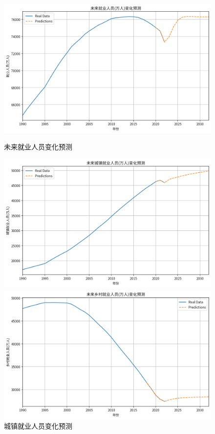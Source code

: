 \begin{figure}[h]
    \centering
    \begin{minipage}{0.3\linewidth}
        \centering
        \includegraphics[width=\linewidth]{figures/26.png}
        \caption{未来就业人员变化预测}
        \label{fig:prediction_employment}
    \end{minipage}\hfill
    \begin{minipage}{0.3\linewidth}
        \centering
        \includegraphics[width=\linewidth]{figures/27.png}
        \caption{城镇就业人员变化预测}
        \label{fig:fit-vs-real_employment_city}
    \end{minipage}\hfill
    \begin{minipage}{0.3\linewidth}
        \centering
        \includegraphics[width=\linewidth]{figures/28.png}

\end{minipage}
\end{figure}
